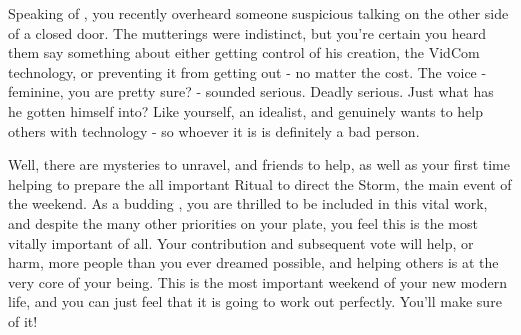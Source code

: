 \documentclass[char]{GL2020}
\begin{document}
Speaking of \cTechStar{}, you recently overheard someone suspicious talking on the other side of a closed door. The mutterings were indistinct, but you’re certain you heard them say something about either getting control of his creation, the VidCom technology, or preventing it from getting out - no matter the cost. The voice - feminine, you are pretty sure? - sounded serious. Deadly serious. Just what has he gotten himself into?  Like yourself, \cTechStar{\they} \cTechStar{\are} an idealist, and genuinely wants to help others with \cTechStar{\their} technology - so whoever it is is definitely a bad person.

Well, there are mysteries to unravel, and friends to help, as well as your first time helping to prepare the all important Ritual to direct the Storm, the main event of the weekend.  As a budding \cDisney{\Clergy}, you are thrilled to be included in this vital work, and despite the many other priorities on your plate, you feel this is the most vitally important of all. Your contribution and subsequent vote will help, or harm, more people than you ever dreamed possible, and helping others is at the very core of your being. This is the most important weekend of your new modern life, and you can just feel that it is going to work out perfectly. You’ll make sure of it!








\end{document}
